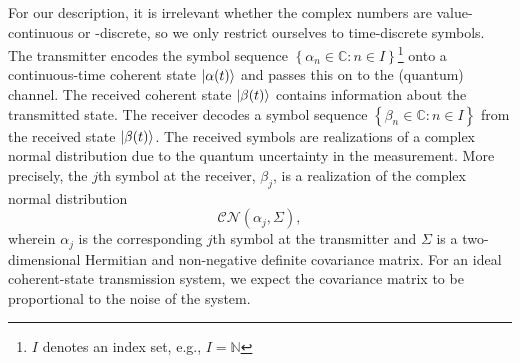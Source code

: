For our description, it is irrelevant whether the complex numbers are value-continuous or -discrete, so we only restrict ourselves to time-discrete symbols.
The transmitter encodes the symbol sequence $\left\{\alpha_n\in\mathbb{C}\colon n\in I\right\}$\footnote{$I$ denotes an index set, e.g., $I=\mathbb{N}$} onto a continuous-time coherent state $\lvert\alpha(t)\rangle$ and passes this on to the (quantum) channel.
The received coherent state $\lvert\beta(t)\rangle$ contains information about the transmitted state.
The receiver decodes a symbol sequence $\left\{\beta_n\in\mathbb{C}\colon n\in I\right\}$ from the received state $\lvert\beta(t)\rangle$.
The received symbols are realizations of a complex normal distribution due to the quantum uncertainty in the measurement.
More precisely, the $j$th symbol at the receiver, $\beta_j$, is a realization of the complex normal distribution
\begin{equation*}
	\mathcal{CN}\left(
		\alpha_j,
		\Sigma
	\right),
\end{equation*}
wherein $\alpha_j$ is the corresponding $j$th symbol at the transmitter and $\Sigma$ is a two-dimensional Hermitian and non-negative definite covariance matrix.
For an ideal coherent-state transmission system, we expect the covariance matrix to be proportional to the noise of the system.